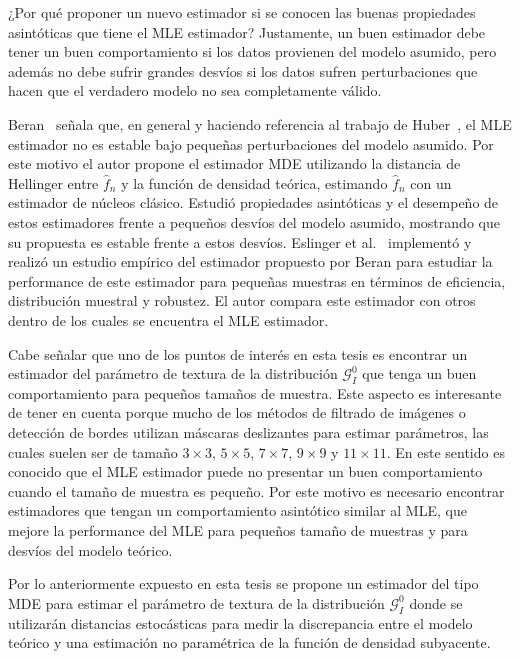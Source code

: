 ¿Por qué proponer un nuevo estimador si se conocen las buenas propiedades asintóticas que tiene el MLE estimador? Justamente, un buen estimador debe tener un buen comportamiento si los datos provienen del modelo asumido, pero además no debe sufrir grandes desvíos si los datos sufren perturbaciones que hacen que el verdadero modelo no sea completamente válido.

Beran~\cite{beran1977} señala que, en general y haciendo referencia al trabajo de Huber~\cite{Huber1972}, el MLE estimador no es estable bajo pequeñas perturbaciones del modelo asumido. Por este motivo el autor propone el estimador MDE utilizando la distancia de Hellinger entre $\widehat{f}_n$ y la función de densidad teórica, estimando $\widehat{f}_n$ con un estimador de núcleos clásico. Estudió propiedades asintóticas y el desempeño de estos estimadores frente a pequeños desvíos del modelo asumido, mostrando que su propuesta es estable frente a estos desvíos. Eslinger et al.~\cite{Eslinger1990} implementó y realizó un estudio empírico del estimador propuesto por Beran para estudiar la performance de este estimador para pequeñas muestras en términos de eficiencia, distribución muestral y robustez. El autor compara este estimador con otros dentro de los cuales se encuentra el MLE estimador.

Cabe señalar que uno de los puntos de interés en esta tesis es encontrar un estimador del parámetro de  textura de la distribución $\mathcal{G}_I^{0}$ que tenga un buen comportamiento para pequeños tamaños de muestra. Este aspecto es interesante de tener en cuenta porque mucho de los métodos de filtrado de imágenes o detección de bordes utilizan máscaras deslizantes para estimar parámetros, las cuales suelen ser de tamaño $3 \times 3$, $5 \times 5$, $7 \times 7$, $9 \times 9$ y $11 \times 11$. En este sentido es conocido que el MLE estimador puede no presentar un buen comportamiento cuando el tamaño de muestra es pequeño. Por este motivo es necesario encontrar estimadores que tengan un comportamiento asintótico similar al MLE, que mejore la performance del MLE para pequeños tamaño de muestras y para desvíos del modelo teórico.

Por lo anteriormente expuesto en esta tesis se propone un estimador del tipo MDE para estimar el parámetro de textura de la distribución $\mathcal{G}_I^{0}$ donde se utilizarán distancias estocásticas para medir la discrepancia entre el modelo teórico y  una estimación no paramétrica de la función de densidad subyacente. 


